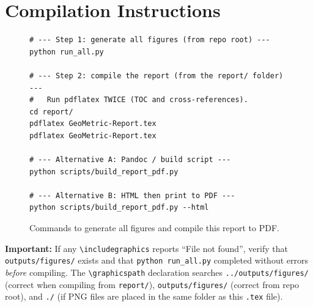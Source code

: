 \documentclass[12pt, a4paper, oneside]{report}
\begin{document}
\chapter{Compilation Instructions}
\label{app:compile}

\begin{figure}[H]
  \centering
  \begin{BVerbatim}[fontsize=\small]
# --- Step 1: generate all figures (from repo root) ---
python run_all.py

# --- Step 2: compile the report (from the report/ folder) ---
#   Run pdflatex TWICE (TOC and cross-references).
cd report/
pdflatex GeoMetric-Report.tex
pdflatex GeoMetric-Report.tex

# --- Alternative A: Pandoc / build script ---
python scripts/build_report_pdf.py

# --- Alternative B: HTML then print to PDF ---
python scripts/build_report_pdf.py --html
  \end{BVerbatim}
  \caption{Commands to generate all figures and compile this report to PDF.}
  \label{fig:compilecmds}
\end{figure}

\begin{limitbox}
\textbf{Important:} If any \verb|\includegraphics| reports ``File not found'', verify
that \texttt{outputs/figures/} exists and that \texttt{python run\_all.py} completed
without errors \emph{before} compiling. The \verb|\graphicspath| declaration searches
\texttt{../outputs/figures/} (correct when compiling from \texttt{report/}),
\texttt{outputs/figures/} (correct from repo root), and \texttt{./} (if PNG files are
placed in the same folder as this \texttt{.tex} file).
\end{limitbox}
\end{document}
